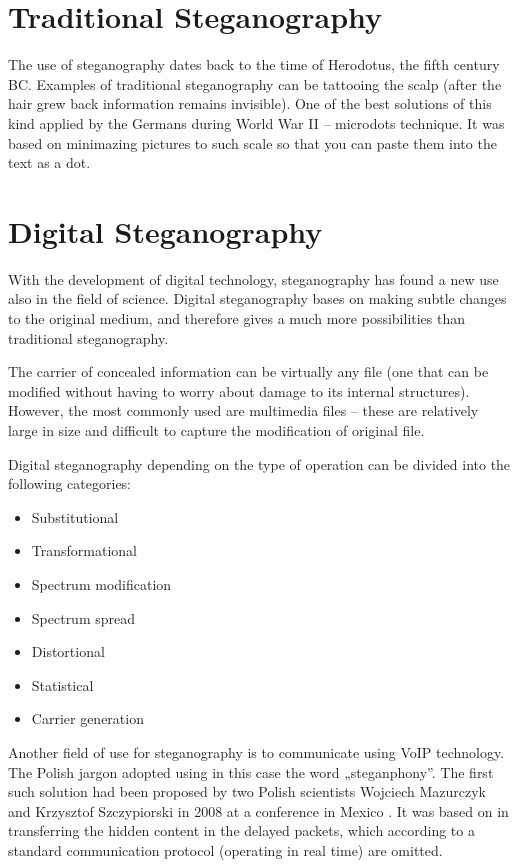 \documentclass[10pt, a5paper]{article}
\begin{document}
\section{Traditional Steganography}

The use of steganography dates back to the time of Herodotus, the fifth century BC. Examples of traditional steganography can be tattooing the scalp (after the hair grew back information remains invisible). One of the best solutions of this kind applied by the Germans during World War II -- microdots technique. It was based on minimazing  pictures to such scale so that you can paste them into the text as a dot.

\section{Digital Steganography}

With the development of digital technology, steganography has found a new use also in the field of science. Digital steganography bases on making subtle changes to the original medium, and therefore gives a much more possibilities than traditional steganography.

The carrier of concealed information can be virtually any file (one that can be modified without having to worry about damage to its internal structures). However, the most commonly used are multimedia files -- these are relatively large in size and difficult to capture the modification of original file.

Digital steganography depending on the type of operation can be divided into the following categories:

\begin{itemize}
  \item Substitutional
  \item Transformational
  \item Spectrum modification
  \item Spectrum spread
  \item Distortional
  \item Statistical
  \item Carrier generation
\end{itemize}

Another field of use for steganography is to communicate using VoIP technology. The Polish jargon adopted using in this case the word „steganphony”. The first such solution had been proposed by two Polish scientists Wojciech Mazurczyk and Krzysztof Szczypiorski in 2008 at a conference in Mexico \footnotemark[11]. It was based on in transferring the hidden content in the delayed packets, which according to a standard communication protocol (operating in real time) are omitted.
\end{document}

